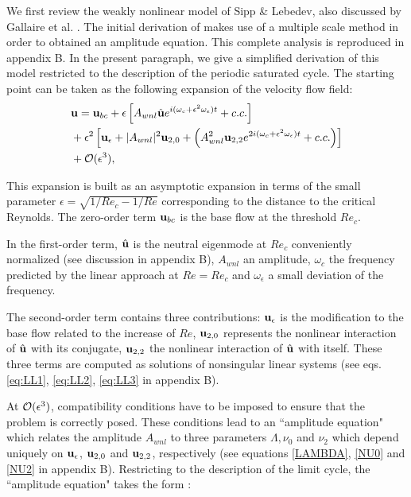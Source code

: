 \documentclass[twocolumn,10pt]{asme2ej}
\newcommand{\be}[1]{ \begin{equation} \label{#1}}
\newcommand{\ee}{\end{equation}}
\begin{document}
We first review the weakly nonlinear model of Sipp \& 
Lebedev\cite{SippLebedev}, also discussed by Gallaire et al. \cite{FDR2016}.  
The initial derivation of \cite{SippLebedev} makes use of a multiple scale method in order to obtained an amplitude equation.
This complete analysis is reproduced in appendix B. In the present paragraph, we give a simplified derivation of this model restricted to the description of the periodic saturated cycle.
The starting point can be taken as the following expansion of the velocity flow field:
\be{WNL1}
\begin{aligned}
&{\bf u} = {}  {\bf u}_{bc} + \epsilon \left[ A_{wnl}  \hat{\bf u} e^{i (\omega_c+\epsilon^2 \omega_\epsilon)  t} + c.c. \right]\\
&+ \epsilon^2 \left[ {\bf u}_\epsilon + |A_{wnl}|^2  {\bf u}_{2,0} + \left(  A_{wnl}^2 {\bf u}_{2,2} e^{2 i(\omega_c+\epsilon^2 \omega_\epsilon)  t} + c.c. \right) \right]\\
& + {\cal O}( \epsilon ^3),
\end{aligned}
\ee



This expansion is built as an asymptotic expansion in terms of the small parameter $\epsilon = \sqrt{1/Re_c - 1/Re}$ corresponding to the distance to the critical Reynolds. 
The zero-order term ${\bf u}_{bc}$ is the base flow at the threshold $Re_c$.

In the first-order term, $\hat{\bf u}$ is the neutral eigenmode at $Re_c$ conveniently normalized (see discussion in appendix B), 
$A_{wnl}$ an amplitude, $\omega_c$ the frequency predicted by the linear approach at $Re=Re_c$ and $\omega_\epsilon$ a small deviation of the frequency. 

The second-order term contains three contributions: ${\bf u}_{\epsilon}$ is the modification to the base flow related to the 
increase of $Re$, ${\bf u}_{2,0}$  represents the nonlinear interaction of $\hat{\bf u}$ with its conjugate, ${\bf u}_{2,2}$ the nonlinear 
interaction of $\hat{\bf u}$ with itself. These three terms are computed as solutions of nonsingular linear systems 
(see eqs. \ref{eq:LL1}, \ref{eq:LL2}, \ref{eq:LL3} in appendix B).

At ${\cal O}( \epsilon ^3)$, compatibility conditions have to be imposed to ensure that the problem is correctly posed. These conditions lead to an ``amplitude equation" which relates the amplitude $ A_{wnl}$ to three parameters $\Lambda, \nu_{0}$ and $\nu_{2}$ which depend
uniquely on ${\bf u}_\epsilon$, ${\bf u}_{2,0}$ and ${\bf u}_{2,2}$, respectively (see equations \ref{LAMBDA}, \ref{NU0} and \ref{NU2} in appendix B). Restricting to the description of the limit cycle, the ``amplitude equation" takes the form :
\end{document}
